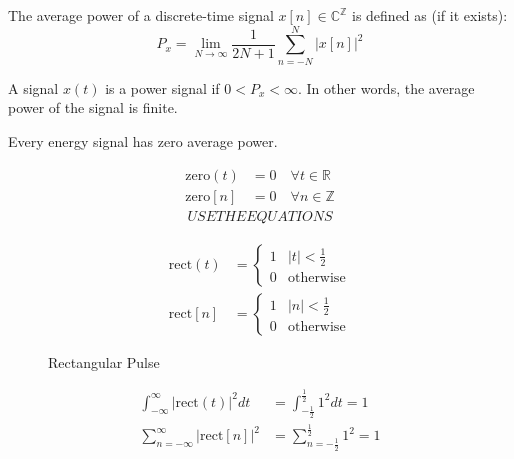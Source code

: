\begin{definition}
    The average power of a discrete-time signal $x[n] \in \mathbb{C}^\mathbb{Z}$ is defined as (if it exists):
    \[
        P_x = \lim_{N \to \infty} \frac{1}{2N+1} \sum_{n=-N}^{N} |x[n]|^2
    \]
\end{definition}


\begin{definition}
    A signal $x(t)$ is a power signal if $0 < P_x < \infty$. In other words, the average power of the signal is finite.
\end{definition}
\begin{corollary}
    Every energy signal has zero average power.
\end{corollary}

\begin{example}
    \begin{align}
        \text{zero}(t) & = 0 \quad \forall t \in \mathbb{R} \\
        \text{zero}[n] & = 0 \quad \forall n \in \mathbb{Z}
    \end{align}
    \begin{align}
        USE THE EQUATIONS
    \end{align}
\end{example}

\begin{example}
    \begin{align}
        \text{rect}(t) & = \begin{cases}
                               1 & |t| < \frac{1}{2} \\
                               0 & \text{otherwise}
                           \end{cases} \\
        \text{rect}[n] & = \begin{cases}
                               1 & |n| < \frac{1}{2} \\
                               0 & \text{otherwise}
                           \end{cases}
    \end{align}
    \begin{figure}[H]
        \centering
        \caption{Rectangular Pulse}
    \end{figure}
    \begin{align}
        \int_{-\infty}^{\infty} |\text{rect}(t)|^2 dt & = \int_{-\frac{1}{2}}^{\frac{1}{2}} 1^2 dt = 1 \\
        \sum_{n=-\infty}^{\infty} |\text{rect}[n]|^2  & = \sum_{n=-\frac{1}{2}}^{\frac{1}{2}} 1^2 = 1
    \end{align}
\end{example}

